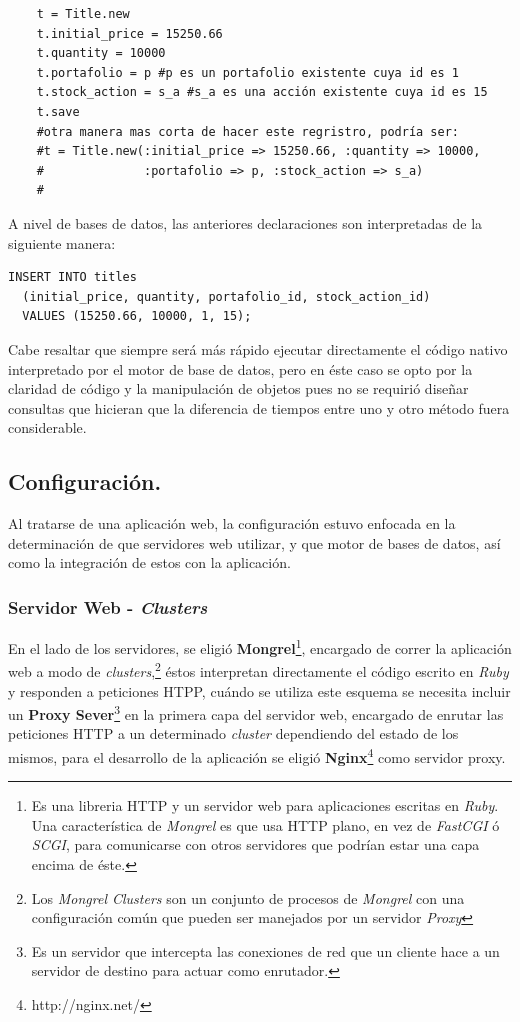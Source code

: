 \begin{verbatim}
	t = Title.new
	t.initial_price = 15250.66
	t.quantity = 10000
	t.portafolio = p #p es un portafolio existente cuya id es 1
	t.stock_action = s_a #s_a es una acción existente cuya id es 15
	t.save
	#otra manera mas corta de hacer este regristro, podría ser:
	#t = Title.new(:initial_price => 15250.66, :quantity => 10000, 
	#			   :portafolio => p, :stock_action => s_a)
	#
\end{verbatim}

A nivel de bases de datos, las anteriores declaraciones son interpretadas de la siguiente manera:

\begin{verbatim}
INSERT INTO titles 
  (initial_price, quantity, portafolio_id, stock_action_id) 
  VALUES (15250.66, 10000, 1, 15);
\end{verbatim}

Cabe resaltar que siempre será más rápido ejecutar directamente el código nativo interpretado por el motor de base de datos, pero en éste caso se opto por la claridad de código y la manipulación de objetos pues no se requirió diseñar consultas que hicieran que la diferencia de tiempos entre uno y otro método fuera considerable.

\subsection{Configuración.}

Al tratarse de una aplicación web, la configuración estuvo enfocada en la determinación de que servidores web utilizar, y que motor de bases de datos, así como la integración de estos con la aplicación.

\subsubsection{Servidor Web - \emph{Clusters}}

En el lado de los servidores, se eligió \textbf{Mongrel}\footnote{Es una libreria HTTP y un servidor web para aplicaciones escritas en \emph{Ruby}. Una característica de \emph{Mongrel} es que usa HTTP plano, en vez de \emph{FastCGI} ó \emph{SCGI}, para comunicarse con otros servidores que podrían estar una capa encima de éste.}, encargado de correr la aplicación web a modo de \emph{clusters},\footnote{Los \emph{Mongrel Clusters} son un conjunto de procesos de \emph{Mongrel} con una configuración común que pueden ser manejados por un servidor \emph{Proxy}} éstos interpretan directamente el código escrito en \emph{Ruby} y responden a peticiones HTPP, cuándo se utiliza este esquema se necesita incluir un \textbf{Proxy Sever}\footnote{Es un servidor que intercepta las conexiones de red que un cliente hace a un servidor de destino para actuar como enrutador.} en la primera capa del servidor web, encargado de enrutar las peticiones HTTP a un determinado \emph{cluster} dependiendo del estado de los mismos, para el desarrollo de la aplicación se eligió \textbf{Nginx}\footnote{http://nginx.net/} como servidor proxy.\\

